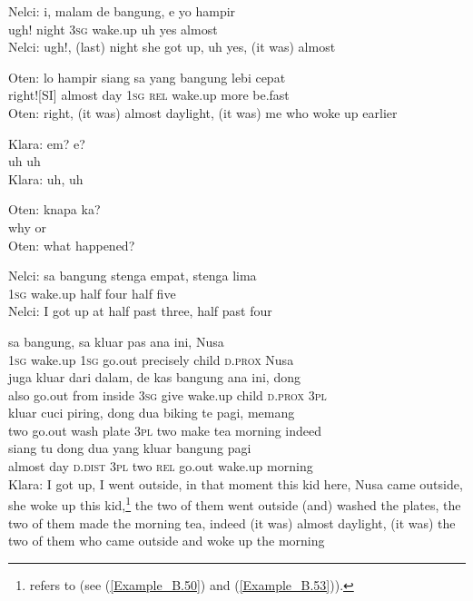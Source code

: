 \ea
\gll   Nelci:   i,   malam   de   bangung,   e   yo   hampir\\
{}     ugh!   night   \textsc{3sg}   wake.up   uh   yes   almost\\
\glt
Nelci: ugh!, (last) night she got up, uh yes, (it was) almost
\z

\ea
\gll   Oten:   lo   hampir   siang   sa   yang   bangung   lebi   cepat\\
 {}    right![SI]   almost   day   \textsc{1sg}   \textsc{rel}   wake.up   more   be.fast\\
\glt
Oten: right, (it was) almost daylight, (it was) me who woke up earlier
\z

\ea
\gll   Klara:   em?   e?\\
{}     uh   uh\\
\glt
Klara: uh, uh
\z

\ea
\gll   Oten:   knapa   ka?\\
 {}    why   or\\
\glt
Oten: what happened?
\z

\ea
\label{Example_B.50}
\gll   Nelci:   sa   bangung   stenga   empat,   stenga   lima\\
{}   \textsc{1sg}   wake.up   half   four   half   five\\
\glt
Nelci: I got up at half past three, half past four
\z

\ea
{}    {sa}    {bangung,}    {sa}    {kluar}    {pas}    {ana}    {ini,}    {Nusa}\\
   {}    {\textsc{1sg}}    {wake.up}    {\textsc{1sg}}    {go.out}    {precisely}    {child}    {\textsc{d.prox}}    {Nusa}\\
\gll  juga    {kluar}    {dari}    {dalam,}    {de}    {kas}    {bangung}    {ana}    {ini,}   dong\\
  also    {go.out}    {from}    {inside}    {\textsc{3sg}}    {give}    {wake.up}    {child}    {\textsc{d.prox}}   \textsc{3pl}\\
    {kluar}    {cuci}    {piring,}    {dong}    {dua}    {biking}    {te}    {pagi,}    {memang}\\
   {two}    {go.out}    {wash}    {plate}    {\textsc{3pl}}    {two}    {make}    {tea}    {morning}    {indeed}\\
    {siang}    {tu}    {dong}    {dua}    {yang}    {kluar}    {bangung}    {pagi}\\
   {almost}    {day}    {\textsc{d.dist}}    {\textsc{3pl}}    {two}    {\textsc{rel}}    {go.out}    {wake.up}    {morning}\\
\glt Klara: I got up, I went outside, in that moment this kid here, Nusa came outside, she woke up this kid,\footnote{ refers to  (see (\ref{Example_B.50}) and (\ref{Example_B.53})).} the two of them went outside (and) washed the plates, the two of them made the morning tea, indeed (it was) almost daylight, (it was) the two of them who came outside and woke up the morning
\z

